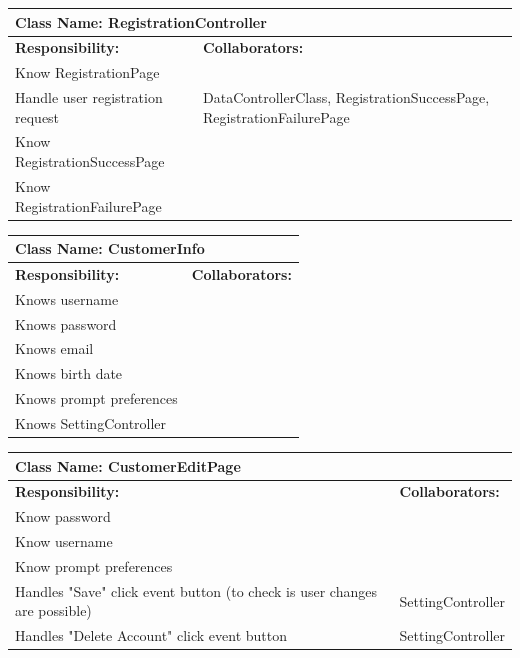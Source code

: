 \documentclass[]{article}
\begin{document}
	\begin{table}[H]
	\centering
	\begin{tabular}{|p{6cm}|p{6cm}|}
	\hline 
		\multicolumn{2}{|l|}{\textbf{Class Name: RegistrationController}} \\
	\hline
	\textbf{Responsibility:} & \textbf{Collaborators:} \\
	\hline
	Know RegistrationPage&\\ \hline
	Handle user registration request & DataControllerClass, RegistrationSuccessPage, RegistrationFailurePage\\ \hline
	Know RegistrationSuccessPage &\\ \hline
	Know RegistrationFailurePage &\\ \hline
	\end{tabular}
	\end{table}
	
	\begin{table}[H]
	\centering
	\begin{tabular}{|p{6cm}|p{6cm}|}
	\hline 
		\multicolumn{2}{|l|}{\textbf{Class Name: CustomerInfo}} \\
	\hline
	\textbf{Responsibility:} & \textbf{Collaborators:} \\
	\hline 
	Knows username&\\ \hline
	Knows password&\\ \hline 
	Knows email&\\ \hline 
	Knows birth date&\\ \hline 
	Knows prompt preferences &\\ \hline
	Knows SettingController &\\ \hline
	\end{tabular}
	\end{table}
		
	\begin{table}[H]
	\centering
	\begin{tabular}{|p{6cm}|p{6cm}|}
	\hline 
		\multicolumn{2}{|l|}{\textbf{Class Name: CustomerEditPage}} \\
	\hline
	\textbf{Responsibility:} & \textbf{Collaborators:} \\
	\hline 
	Know password & \\ \hline
	Know username & \\ \hline
	Know prompt preferences & \\ \hline
	Handles "Save" click event button (to check is user changes are possible) & SettingController\\ \hline 
	Handles "Delete Account" click event button & SettingController\\ \hline
	\end{tabular}
	\end{table}
	
\end{document}
